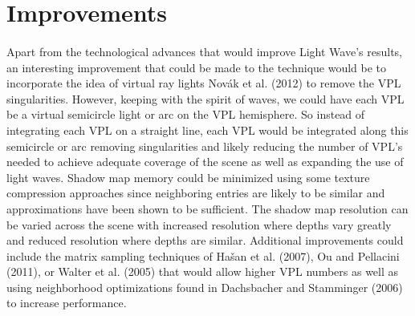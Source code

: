 \section{Improvements}
\paragraph{}
Apart from the technological advances that would improve Light Wave's results, an interesting improvement that could be made to the technique would be to incorporate the idea of virtual ray lights Nov\'{a}k et al. (2012) to remove the VPL singularities.  However, keeping with the spirit of waves, we could have each VPL be a virtual semicircle light or arc on the VPL hemisphere.  So instead of integrating each VPL on a straight line, each VPL would be integrated along this semicircle or arc removing singularities and likely reducing the number of VPL's needed to achieve adequate coverage of the scene as well as expanding the use of light waves.  Shadow map memory could be minimized using some texture compression approaches since neighboring entries are likely to be similar and approximations have been shown to be sufficient.  The shadow map resolution can be varied across the scene with increased resolution where depths vary greatly and reduced resolution where depths are similar.  Additional improvements could include the matrix sampling techniques of Ha\v{s}an et al. (2007), Ou and Pellacini (2011), or Walter et al. (2005) that would allow higher VPL numbers as well as using neighborhood optimizations found in Dachsbacher and Stamminger (2006) to increase performance.